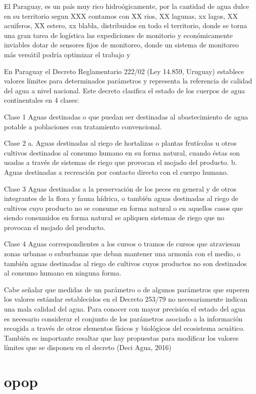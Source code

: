 El Paraguay, es un pa\'is muy rico hidro\'ogicamente, por la cantidad de agua dulce en su territorio segun XXX contamos con XX rios, XX lagunas, xx lagos, XX acuiferos, XX estero, xx blabla, distribuidos en todo el territorio, donde se torna una gran tarea de log\'istica las expediciones de monitorio y econ\'omicamente inviables dotar de sensores fijos de monitoreo, donde un sistema de monitoreo m\'as vers\'atil podr\'ia optimizar el trabajo y 


En Paraguay el Decreto Reglamentario 222/02 (Ley 14.859, Uruguay) establece valores límites para determinados parámetros y representa la referencia de calidad del agua a nivel nacional. Este decreto clasifica el estado de los cuerpos de agua continentales en 4 clases:

Clase 1
Aguas destinadas o que puedan ser destinadas al abastecimiento de agua potable a poblaciones con tratamiento convencional.

Clase 2
a. Aguas destinadas al riego de hortalizas o plantas frutícolas u otros cultivos destinados al consumo humano en su forma natural, cuando éstas son usadas a través de sistemas de riego que provocan el mojado del producto.
b. Aguas destinadas a recreación por contacto directo con el cuerpo humano.

Clase 3
Aguas destinadas a la preservación de los peces en general y de otros integrantes de la flora y fauna hídrica, o también aguas destinadas al riego de cultivos cuyo producto no se consume en forma natural o en aquellos casos que siendo consumidos en forma natural se apliquen sistemas de riego que no provocan el mojado del producto.

Clase 4
Aguas correspondientes a los cursos o tramos de cursos que atraviesan zonas urbanas o suburbanas que deban mantener una armonía con el medio, o también aguas destinadas al riego de cultivos cuyos productos no son destinados al consumo humano en ninguna forma.

Cabe señalar que medidas de un parámetro o de algunos parámetros que superen los valores estándar establecidos en el Decreto 253/79 no necesariamente indican una mala calidad del agua. Para conocer con mayor precisión el estado del agua es necesario considerar el conjunto de los parámetros asociado a la información recogida a través de otros elementos físicos y biológicos del ecosistema acuático. También es importante resaltar que hay propuestas para modificar los valores límites que se disponen en el decreto (Deci Agua, 2016)


\section{opop}

